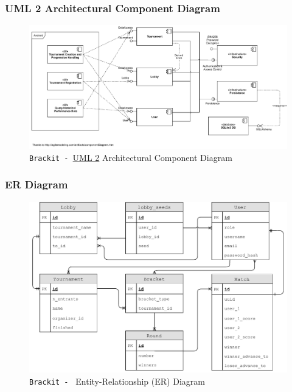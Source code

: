 \documentclass{article}
\begin{document}
\subsubsection{UML 2 Architectural Component Diagram}
\vfill
\begin{center}
    \begin{figure}[htp]
        \centering
        \includegraphics[width=18.5cm]{../diagrams/component_diag.pdf}
        \caption{\texttt{Brackit - }\href{https://sparxsystems.com/resources/tutorials/uml2/index.html}{UML 2} Architectural Component Diagram}
        \end{figure}
\end{center}
\vfill

\clearpage
\subsubsection{ER Diagram}
\vfill
\begin{center}
    \begin{figure}[h]
        \centering
        \includegraphics[width=18.5cm]{../diagrams/er_compressed.pdf}
        \caption{\texttt{Brackit - } Entity-Relationship (ER) Diagram}
        \end{figure}
\end{center}
\vfill
\clearpage
\end{document}
